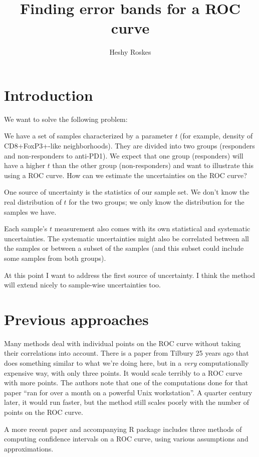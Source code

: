 \documentclass[11pt]{article}
\title{Finding error bands for a ROC curve}
\author{Heshy Roskes}
\date{}
\begin{document}
\maketitle

\section{Introduction}

We want to solve the following problem:

We have a set of samples characterized by a parameter \(t\) (for example, density of CD8+FoxP3+-like neighborhoods).  They are divided into two groups (responders and non-responders to anti-PD1).  We expect that one group (responders) will have a higher \(t\) than the other group (non-responders) and want to illustrate this using a ROC curve.  How can we estimate the uncertainties on the ROC curve?

One source of uncertainty is the statistics of our sample set.  We don't know the real distribution of \(t\) for the two groups; we only know the distribution for the samples we have.

Each sample's \(t\) measurement also comes with its own statistical and systematic uncertainties.  The systematic uncertainties might also be correlated between all the samples or between a subset of the samples (and this subset could include some samples from both groups).

At this point I want to address the first source of uncertainty.  I think the method will extend nicely to sample-wise uncertainties too.

\section{Previous approaches}

Many methods \autocite{roc_kerekes} deal with individual points on the ROC curve without taking their correlations into account.  There is a paper from Tilbury 25 years ago \autocite{roc_tilbury} that does something similar to what we're doing here, but in a \emph{very} computationally expensive way, with only three points.  It would scale terribly to a ROC curve with more points.  The authors note that one of the computations done for that paper ``ran for over a month on a powerful Unix workstation''.  A quarter century later, it would run faster, but the method still scales poorly with the number of points on the ROC curve.

A more recent paper and accompanying R package \autocite{roc_fernandez} includes three methods of computing confidence intervals on a ROC curve, using various assumptions and approximations.
\end{document}
